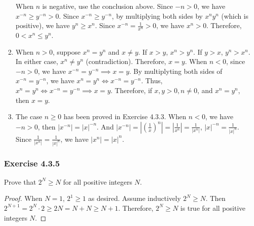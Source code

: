 \documentclass[12pt, letter]{article}
\newcommand{\ssc}{\subsubsection* }
\newcommand{\E}{Exercise }
\begin{document}
\begin{enumerate}[label=(\alph*)]
    When $n$ is negative, use the conclusion above. Since $-n>0$, we have $x^{-n}\geq y^{-n}>0$. Since $x^{-n}\geq y^{-n}$, by multiplying both sides by $x^n y^n$ (which is positive), we have 
    $y^n\geq x^n$. Since $x^{-n}=\frac{1}{x^n}>0$, we have $x^n>0$. Therefore, $0<x^n\leq y^n$.
    \item When $n>0$, suppose $x^n=y^n$ and $x\ne y$. If $x>y$, $x^n>y^n$. If $y>x$, $y^n>x^n$. In either case, $x^n\ne y^n$ (contradiction). Therefore, $x=y$. When $n<0$, 
    since $-n>0$, we have $x^{-n}=y^{-n}\implies x=y$. By multiplyting both sides of $x^{-n}=y^{-n}$, we have $x^n=y^n\iff x^{-n}=y^{-n}$. Thus, $x^n=y^n\iff x^{-n}=y^{-n}\implies x=y$.
    Therefore, if $x,y>0,n\ne 0$, and $x^n=y^n$, then $x=y$.
    \item The case $n\geq 0$ has been proved in Exercise 4.3.3. When $n<0$, we have $-n>0$, then $|x^{-n}|=|x|^{-n}$. And $|x^{-n}|=|(\frac{1}{x})^n|=|\frac{1}{x^n}|=\frac{1}{|x^n|}$,
    $|x|^{-n}=\frac{1}{|x|^n}$. Since $\frac{1}{|x^n|}=\frac{1}{|x|^n}$, we have $|x^n|=|x|^n$. 
\end{enumerate}
\ssc{\E 4.3.5}
Prove that $2^N\geq N$ for all positive integers $N$.
\begin{proof}
    When $N=1$, $2^1\geq 1$ as desired. Assume inductively $2^N\geq N$. Then $2^{N+1}=2^N\cdot 2\geq 2N=N+N\geq N+1$. Therefore, $2^N\geq N$ is true for all positive integers $N$.
\end{proof}
\end{document}
